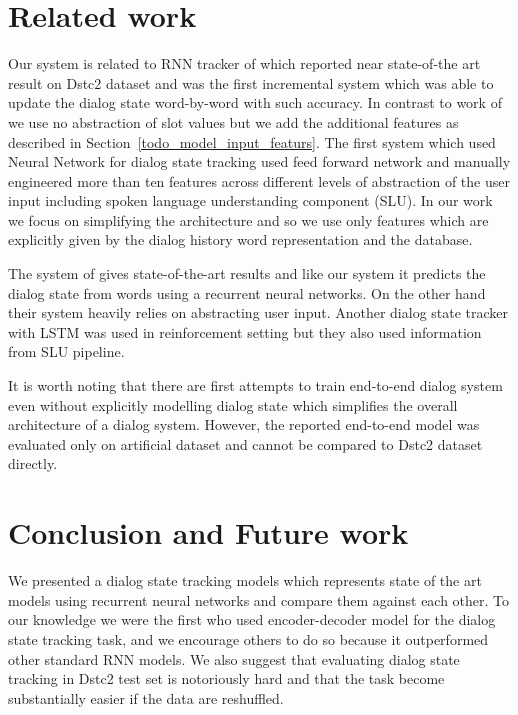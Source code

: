 \documentclass{itatnew}
\begin{document}
\section{Related work}
\label{sec:related}
Our system is related to RNN tracker of \cite{zilka2015incremental} which reported near state-of-the art result on Dstc2 dataset and was the first incremental system which was able to update the dialog state word-by-word with such accuracy.
In contrast to work of \cite{zilka2015incremental} we use no abstraction of slot values but we add the additional features as described in Section~\ref{todo_model_input_featurs}.
The first system which used Neural Network for dialog state tracking \cite{henderson2013deep} used feed forward network and manually engineered more than ten features across different levels of abstraction of the user input including spoken language understanding component (SLU).
In our work we focus on simplifying the architecture and so we use only features which are explicitly given by the dialog history word representation and the database.

The system of \cite{henderson2014word} gives state-of-the-art results and like our system it predicts the dialog state from words using a recurrent neural networks.
On the other hand their system heavily relies on abstracting user input.
Another dialog state tracker with LSTM was used in reinforcement setting but they also used information from SLU pipeline.\cite{lee2016dialog}

It is worth noting that there are first attempts to train end-to-end dialog system even without explicitly modelling dialog state\cite{bordes2016learning} which simplifies the overall architecture of a dialog system.
However, the reported end-to-end model was evaluated only on artificial dataset and cannot be compared to Dstc2 dataset directly.

\section{Conclusion and Future work}
\label{sec:conc}
We presented a dialog state tracking models which represents state of the art models using recurrent neural networks and compare them against each other.
To our knowledge we were the first who used encoder-decoder model for the dialog state tracking task, and we encourage others to do so because it outperformed other standard RNN models.
We also suggest that evaluating dialog state tracking in  Dstc2 test set is notoriously hard and that the task become substantially easier if the data are reshuffled.
\end{document}
